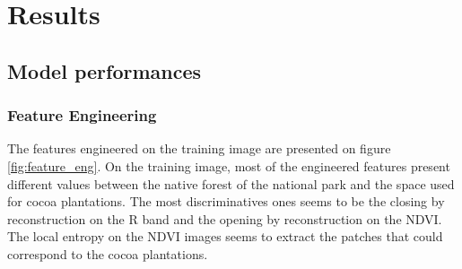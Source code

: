\documentclass[a4paper, 12pt]{article}
\begin{document}
\section{Results}
    \subsection{Model performances}
        \subsubsection{Feature Engineering}
            The features engineered on the training image are presented on figure \ref{fig:feature_eng}. On the training image, most of the engineered features present different values between the native forest of the national park and the space used for cocoa plantations. The most discriminatives ones seems to be the closing by reconstruction on the R band and the opening by reconstruction on the NDVI. The local entropy on the NDVI images seems to extract the patches that could correspond to the cocoa plantations.
\end{document}
